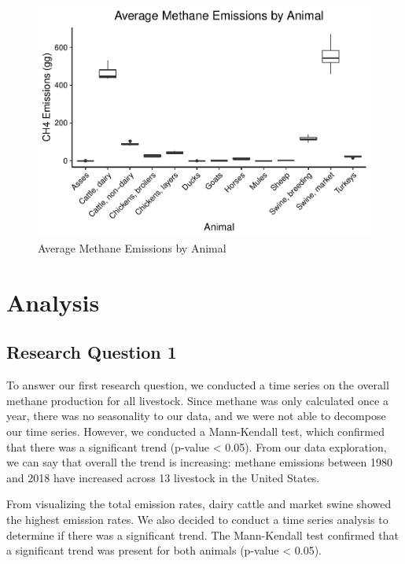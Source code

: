 \documentclass[
  12pt,
]{article}
\begin{document}
\begin{figure}
\centering
\includegraphics{Methane_Project_Template_files/figure-latex/viewing boxplot of methane by animal-1.pdf}
\caption{Average Methane Emissions by Animal}
\end{figure}

\newpage

\hypertarget{analysis}{%
\section{Analysis}\label{analysis}}

\hypertarget{research-question-1}{%
\subsection{Research Question 1}\label{research-question-1}}

To answer our first research question, we conducted a time series on the
overall methane production for all livestock. Since methane was only
calculated once a year, there was no seasonality to our data, and we
were not able to decompose our time series. However, we conducted a
Mann-Kendall test, which confirmed that there was a significant trend
(p-value \textless{} 0.05). From our data exploration, we can say that
overall the trend is increasing: methane emissions between 1980 and 2018
have increased across 13 livestock in the United States.

From visualizing the total emission rates, dairy cattle and market swine
showed the highest emission rates. We also decided to conduct a time
series analysis to determine if there was a significant trend. The
Mann-Kendall test confirmed that a significant trend was present for
both animals (p-value \textless{} 0.05).
\end{document}
